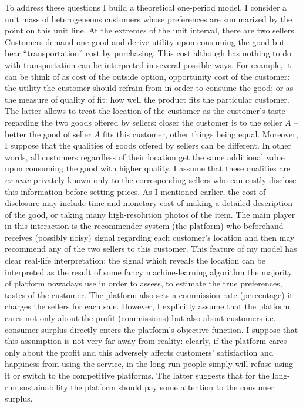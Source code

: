 \documentclass[a4paper]{article}
\begin{document}
	To address these questions I build a theoretical one-period model. I consider a unit mass of heterogeneous customers whose preferences are summarized by the point on this unit line. At the extremes of the unit interval, there are two sellers. Customers demand one good and derive utility upon consuming the good but bear ``transportation'' cost by purchasing. This cost although has nothing to do with transportation can be interpreted in several possible ways. For example, it can be think of as cost of the outside option, opportunity cost of the customer: the utility the customer should refrain from in order to consume the good; or as the measure of quality of fit: how well the product fits the particular customer. The latter allows to treat the location of the customer as the customer's taste regarding the two goods offered by sellers: closer the customer is to the seller $A$ -- better the good of seller $A$ fits this customer, other things being equal. Moreover, I suppose that the qualities of goods offered by sellers can be different. In other words, all customers regardless of their location get the same additional value upon consuming the good with higher quality. I assume that these qualities are \textit{ex-ante} privately known only to the corresponding sellers who can costly disclose this information before setting prices. As I mentioned earlier, the cost of disclosure may include time and monetary cost of making a detailed description of the good, or taking many high-resolution photos of the item. The main player in this interaction is the recommender system (the platform) who beforehand receives (possibly noisy) signal regarding each customer's location and then may recommend any of the two sellers to this customer. This feature of my model has clear real-life interpretation: the signal which reveals the location can be interpreted as the result of some fancy machine-learning algorithm the majority of platform nowadays use in order to assess, to estimate the true preferences, tastes of the customer. The platform also sets a commission rate (percentage) it charges the sellers for each sale. However, I explicitly assume that the platform cares not only about the profit (commissions) but also about customers i.e. consumer surplus directly enters the platform's objective function. I suppose that this assumption is not very far away from reality: clearly, if the platform cares only about the profit and this adversely affects customers' satisfaction and happiness from using the service, in the long-run people simply will refuse using it or switch to the competitive platforms. The latter suggests that for the long-run sustainability the platform should pay some attention to the consumer surplus. 
	
\end{document}
